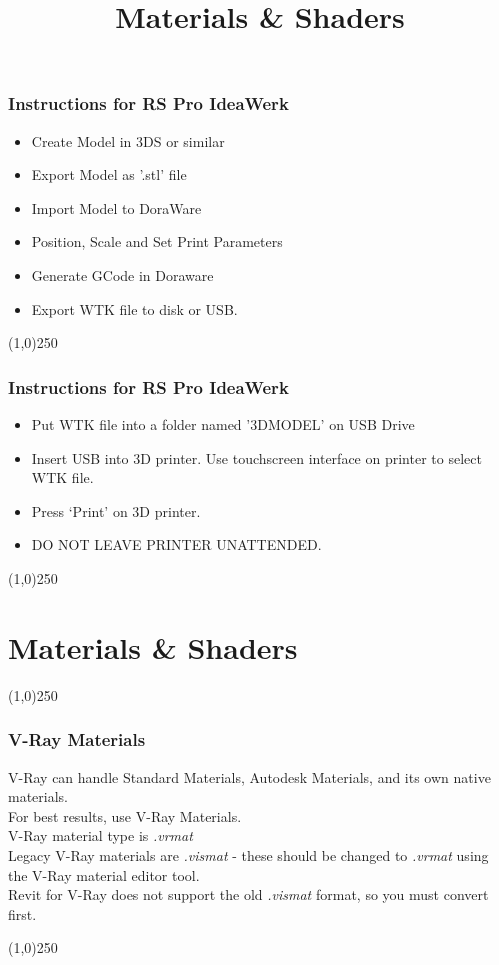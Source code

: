\begin{frame}
\frametitle{Instructions for RS Pro IdeaWerk}
\begin{itemize}
	\item Create Model in 3DS or similar
	\item Export Model as '.stl' file
	\item Import Model to DoraWare
	\item Position, Scale and Set Print Parameters
	\item Generate GCode in Doraware
	\item Export WTK file to disk or USB.
\end{itemize}
\end{frame}
\begin{center}\line(1,0){250}\end{center}


\begin{frame}
\frametitle{Instructions for RS Pro IdeaWerk}
\begin{itemize}
	\item Put WTK file into a folder named '3DMODEL' on USB Drive
	\item Insert USB into 3D printer. Use touchscreen interface on printer to select WTK file.
	\item Press `Print' on 3D printer.
	\item DO NOT LEAVE PRINTER UNATTENDED.
\end{itemize}
\end{frame}
\begin{center}\line(1,0){250}\end{center}





\section{Materials \& Shaders}
\begin{frame}
\title[Materials \& Shaders]{Materials \& Shaders}
\titlepage
\end{frame}\begin{center}\line(1,0){250}\end{center}




\begin{frame}
	\frametitle{V-Ray Materials}
	V-Ray can handle Standard Materials, Autodesk Materials, and its own native materials.\\
	For best results, use V-Ray Materials.\\
	V-Ray material type is \textit{.vrmat}\\
	Legacy V-Ray materials are \textit{.vismat} - these should be changed to \textit{.vrmat} using the V-Ray material editor tool.\\
	Revit for V-Ray does not support the old \textit{.vismat} format, so you must convert first.
\end{frame}
\begin{center}\line(1,0){250}\end{center}

